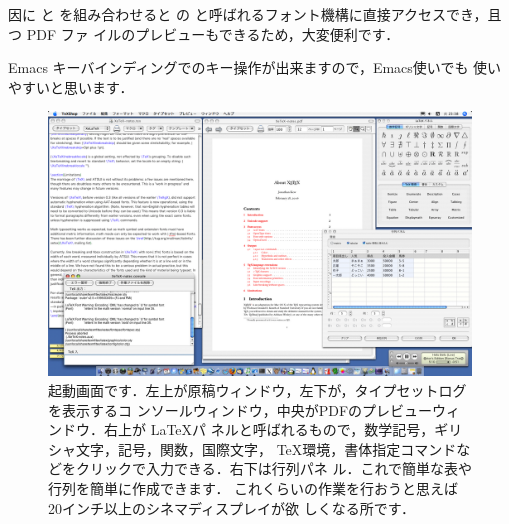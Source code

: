 因に \Prog[XeTeX]{\XeTeX} と  を組み合わせると  の  と呼ばれるフォント機構に直接アクセスでき，且つ PDF ファ
イルのプレビューもできるため，大変便利です．

Emacs キーバインディングでのキー操作が出来ますので，Emacs使いでも
使いやすいと思います．

\begin{figure}[htbp]
 \begin{center}
 \includegraphics[width=\linewidth]{images/TeXShop01}
 \caption[\TeX Shop の起動画面]
 {起動画面です．左上が原稿ウィンドウ，左下が，タイプセットログを表示するコ
 ンソールウィンドウ，中央がPDFのプレビューウィンドウ．右上が \LaTeX パ
 ネルと呼ばれるもので，数学記号，ギリシャ文字，記号，関数，国際文字，
 \TeX 環境，書体指定コマンドなどをクリックで入力できる．右下は行列パネ
 ル．これで簡単な表や行列を簡単に作成できます．
 これくらいの作業を行おうと思えば20インチ以上のシネマディスプレイが欲
 しくなる所です．}
 \end{center}
\end{figure} 

